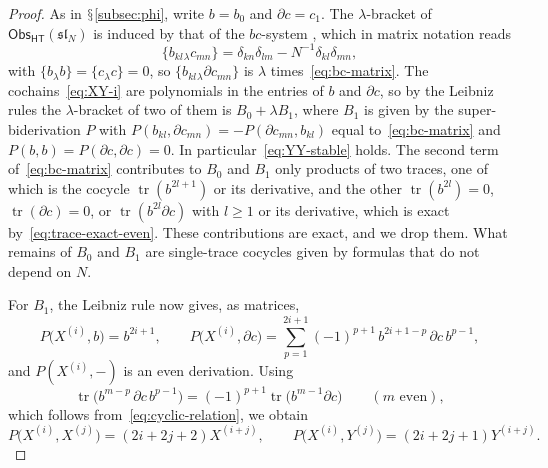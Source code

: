 \documentclass[11pt]{amsart}
\numberwithin{equation}{section}
\renewcommand{\S}{\mbox{$\mathsection$}}
\theoremstyle{definition}
\theoremstyle{remark}
\newcommand{\dd}{\partial}
\newcommand{\Obs}{\mathsf{Obs}_{\mathsf{HT}}}
\begin{document}
\begin{proof}
As in \S\ref{subsec:phi}, write $b=b_0$ and $\dd c=c_1$. The $\lambda$-bracket of $\Obs(\mathfrak{sl}_N)$ is induced by that of the $bc$-system \cite{Kha26}, which in matrix notation reads
\begin{equation}\label{eq:bc-matrix}
\{b_{kl}{}_\lambda c_{mn}\}=\delta_{kn}\delta_{lm}-N^{-1}\delta_{kl}\delta_{mn},
\end{equation}
with $\{b_\lambda b\}=\{c_\lambda c\}=0$, so $\{b_{kl}{}_\lambda\dd c_{mn}\}$ is $\lambda$ times~\eqref{eq:bc-matrix}. The cochains~\eqref{eq:XY-i} are polynomials in the entries of $b$ and $\dd c$, so by the Leibniz rules the $\lambda$-bracket of two of them is $B_0+\lambda B_1$, where $B_1$ is given by the super-biderivation $P$ with $P(b_{kl},\dd c_{mn})=-P(\dd c_{mn},b_{kl})$ equal to~\eqref{eq:bc-matrix} and $P(b,b)=P(\dd c,\dd c)=0$. In particular~\eqref{eq:YY-stable} holds. The second term of~\eqref{eq:bc-matrix} contributes to $B_0$ and $B_1$ only products of two traces, one of which is the cocycle $\operatorname{tr}(b^{2l+1})$ or its derivative, and the other $\operatorname{tr}(b^{2l})=0$, $\operatorname{tr}(\dd c)=0$, or $\operatorname{tr}(b^{2l}\dd c)$ with $l\ge1$ or its derivative, which is exact by~\eqref{eq:trace-exact-even}. These contributions are exact, and we drop them. What remains of $B_0$ and $B_1$ are single-trace cocycles given by formulas that do not depend on $N$.

For $B_1$, the Leibniz rule now gives, as matrices,
\begin{equation}\label{eq:P-matrices}
P\bigl(X^{(i)},b\bigr)=b^{2i+1},\qquad P\bigl(X^{(i)},\dd c\bigr)=\sum_{p=1}^{2i+1}(-1)^{p+1}\,b^{2i+1-p}\,\dd c\,b^{p-1},
\end{equation}
and $P(X^{(i)},-)$ is an even derivation. Using
\begin{equation}\label{eq:rotation}
\operatorname{tr}\bigl(b^{m-p}\,\dd c\,b^{p-1}\bigr)=(-1)^{p+1}\operatorname{tr}\bigl(b^{m-1}\dd c\bigr)\qquad(m\text{ even}),
\end{equation}
which follows from~\eqref{eq:cyclic-relation}, we obtain
\begin{equation}\label{eq:P-results}
P\bigl(X^{(i)},X^{(j)}\bigr)=(2i+2j+2)X^{(i+j)},\qquad P\bigl(X^{(i)},Y^{(j)}\bigr)=(2i+2j+1)Y^{(i+j)}.
\end{equation}


\end{proof}
\end{document}

